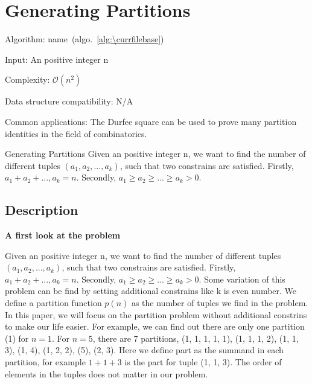 \documentclass[catalog.tex]{subfiles}
\begin{document}
\def\pbname{Generating Partitions} %

\section{\pbname} 

\begin{overview}
\item [Algorithm:] name~(algo.~\ref{alg:\currfilebase}) 
\item [Input:] An positive integer n
\item [Complexity:] $\mathcal{O}(n^2)$
\item [Data structure compatibility:] N/A
\item [Common applications:] The Durfee square can be used to prove many partition identities in the field of combinatorics.
\end{overview}


\begin{problem}{\pbname}
	Given an positive integer n, we want to find the number of different tuples $(a_1, a_2, ..., a_k)$, such that two constrains are satisfied. Firstly, $a_1 + a_2 + ..., a_k = n$. Secondly, $a_1 \geq a_2 \geq ... \geq a_k > 0$\cite{part}. 

\end{problem}

\subsection*{Description}

	\textbf{A first look at the problem}

	Given an positive integer n, we want to find the number of different tuples $(a_1, a_2, ..., a_k)$, such that two constrains are satisfied. Firstly, $a_1 + a_2 + ..., a_k = n$. Secondly, $a_1 \geq a_2 \geq ... \geq a_k > 0$. Some variation of this problem can be find by setting additional constrains like k is even number. We define a partition function $p(n)$ as the number of tuples we find in the problem. In this paper, we will focus on the partition problem without additional constrins to make our life easier. For example, we can find out there are only one partition (1) for $n = 1$. For $n = 5$, there are 7 partitions, (1, 1, 1, 1, 1), (1, 1, 1, 2), (1, 1, 3), (1, 4), (1, 2, 2), (5), (2, 3). Here we define part as the summand in each partition, for example $1 + 1 + 3$ is the part for tuple (1, 1, 3). The order of elements in the tuples does not matter in our problem.
\end{document}
